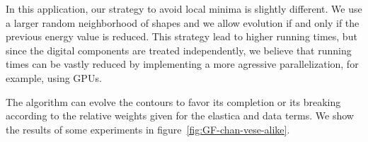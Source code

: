 \documentclass[smallextended]{svjour3}
\begin{document}
In this application, our strategy to avoid local minima is slightly different. We use a larger random neighborhood of shapes and we allow evolution if and only if the previous energy value is reduced. This strategy lead to higher running times, but since the digital components are treated independently, we believe that running times can be vastly reduced by implementing a more agressive parallelization, for example, using GPUs. 

The algorithm can evolve the contours to favor its completion or its breaking according to the relative weights given for the elastica and data terms. We show the results of some experiments in figure~\ref{fig:GF-chan-vese-alike}.

\begin{figure}
\center
{}
\end{figure}
\end{document}
